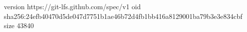 version https://git-lfs.github.com/spec/v1
oid sha256:24efb40470d5de047d7751b1ae46b72d4fb1bb416a8129001ba79b3e3e834cbf
size 43840
